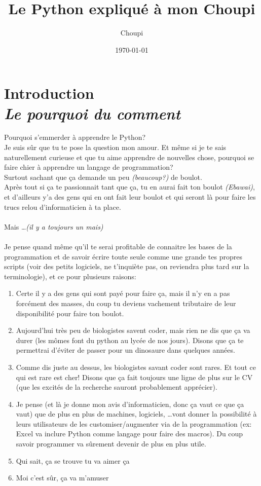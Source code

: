 \documentclass[a4paper, 11pt, oneside, draft]{book}
\title{Le Python expliqu\'e \`a mon Choupi}
\author{Choupi}
\date{\today}
\newcommand\Chapter[2]{
	\chapter[#1]{#1\\[2ex]\Large\itshape#2}
}
\begin{document}
\maketitle

\frontmatter
\Chapter{Introduction}{Le pourquoi du comment}
Pourquoi s'emmerder \`a apprendre le Python? \\
Je suis s\^ur que tu te pose la question mon amour. Et m\^eme si je te sais naturellement curieuse et que tu aime apprendre de nouvelles chose, pourquoi se faire chier \`a apprendre un langage de programmation?\\
Surtout sachant que \c ca demande un peu \textit{(beaucoup?)} de boulot.\\
Apr\`es tout si \c ca te passionnait tant que \c ca, tu en aurai fait ton boulot \textit{(Ebawai)}, et d'ailleurs y'a des gens qui en ont fait leur boulot et qui seront l\`a pour faire les trucs relou d'informaticien \`a ta place.\\
\\
Mais \dots  \textit{(il y a toujours un mais)}\\
\\
Je pense quand m\^eme qu'il te serai profitable de connaitre les bases de la programmation et de savoir
\'ecrire toute seule comme une grande tes propres scripts (voir des petits logiciels, ne t'inqui\`ete pas,
on reviendra plus tard sur la terminologie), et ce pour plusieurs raisons:
\begin{enumerate}
\item Certe il y a des gens qui sont pay\'e pour faire \c ca, mais il n'y en a pas forc\'ement des masses, du coup tu deviens vachement tributaire de leur disponibilit\'e pour faire ton boulot.
\item Aujourd'hui tr\`es peu de biologistes savent coder, mais rien ne dis que \c ca va durer (les mômes font du python au lyc\'ee de nos jours). Disons que \c ca te permettrai d'\'eviter de passer pour un dinosaure dans quelques ann\'ees.
\item Comme dis juste au dessus, les biologistes savant coder sont rares. Et tout ce qui est rare est cher!  Disons que \c ca fait toujours une ligne de plus sur le CV (que les excit\'es de la recherche sauront probablement appr\'ecier).
\item Je pense (et l\`a je donne mon avis d'informaticien, donc \c ca vaut ce que \c ca vaut) que de plus en plus de machines, logiciels, \dots vont donner la possibilit\'e \`a leurs utilisateurs de les customiser/augmenter via de la programmation (ex: Excel va inclure Python comme langage pour faire des macros). Du coup savoir programmer va sûrement devenir de plus en plus utile.
\item Qui sait, \c ca se trouve tu va aimer \c ca \smiley{}
\item Moi c'est s\^ur, \c ca va m'amuser
\end{enumerate}
\end{document}
